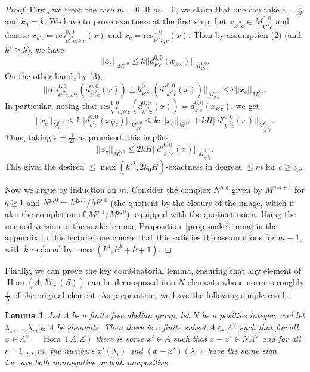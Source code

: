 \documentclass[11pt]{amsbook}
\DeclareMathOperator{\Hom}{Hom}
\numberwithin{equation}{section}
\numberwithin{theorem}{section}
\newtheorem{lemma}[theorem]{Lemma}
\theoremstyle{definition}
\begin{document}
\begin{proof} First, we treat the case $m=0$. If $m=0$, we claim that one can take $\epsilon=\tfrac 1{2k}$ and $k_0=k$. We have to prove exactness at the first step. Let $x_{k'^2c}\in M^{0,0}_{k'^2c}$ and denote $x_{k'c}=\mathrm{res}_{k'^2c,k'c}^{0,0}(x)$ and $x_c=\mathrm{res}_{k'^2c,c}^{0,0}(x)$. Then by assumption (2) (and $k'\geq k$), we have
\[
||x_c||_{M^{0,0}_c}\leq k||d^{0,0}_{k'c}(x_{k'c})||_{M^{1,0}_{k'c}}.
\]
On the other hand, by (3),
\[
||\mathrm{res}_{k'^2c,k'c}^{1,0}(d^{0,0}_{k'^2c}(x))\pm h^0_{k'^2c}(d'^{0,0}_{k'^2c}(x))||_{M^{1,0}_{k'c}}\leq \epsilon ||x_c||_{M^{0,0}_c}.
\]
In particular, noting that $\mathrm{res}_{k'^2c,k'c}^{1,0}(d^{0,0}_{k'^2c}(x)) = d^{0,0}_{k'c}(x_{k'c})$, we get
\[
||x_c||_{M^{0,0}_c}\leq k||d^{0,0}_{k'c}(x_{k'c})||_{M^{1,0}_{k'c}}\leq k\epsilon ||x_c||_{M^{0,0}_c} + kH ||d'^{0,0}_{k'^2c}(x)||_{M^{0,1}_{k'^2c}}.
\]
Thus, taking $\epsilon=\tfrac 1{2k}$ as promised, this implies
\[
||x_c||_{M^{0,0}_c}\leq 2kH ||d'^{0,0}_{k'^2c}(x)||_{M^{0,1}_{k'^2c}}.
\]
This gives the desired $\leq \max(k'^2,2k_0H)$-exactness in degrees $\leq m$ for $c\geq c_0$.

Now we argue by induction on $m$. Consider the complex $N^{p,q}$ given by $M^{p,q+1}$ for $q\geq 1$ and $N^{p,0} = M^{p,1}/\overline{M^{p,0}}$ (the quotient by the closure of the image, which is also the completion of $M^{p,1}/M^{p,0}$), equipped with the quotient norm. Using the normed version of the snake lemma, Proposition~\ref{prop:snakelemma} in the appendix to this lecture, one checks that this satisfies the assumptions for $m-1$, with $k$ replaced by $\max(k^4,k^3+k+1)$.
\end{proof}

Finally, we can prove the key combinatorial lemma, ensuring that any element of $\Hom(\Lambda,\overline{\mathcal M}_{r'}(S))$ can be decomposed into $N$ elements whose norm is roughly $\tfrac 1N$ of the original element. As preparation, we have the following simple result.

\begin{lemma} Let $\Lambda$ be a finite free abelian group, let $N$ be a positive integer, and let $\lambda_1,\ldots,\lambda_m\in \Lambda$ be elements. Then there is a finite subset $A\subset \Lambda^\vee$ such that for all $x\in \Lambda^\vee=\Hom(\Lambda,\mathbb Z)$ there is some $x'\in A$ such that $x-x'\in N\Lambda^\vee$ and for all $i=1,\ldots,m$, the numbers $x'(\lambda_i)$ and $(x-x')(\lambda_i)$ have the same sign, i.e.~are both nonnegative or both nonpositive.
\end{lemma}
\end{document}
